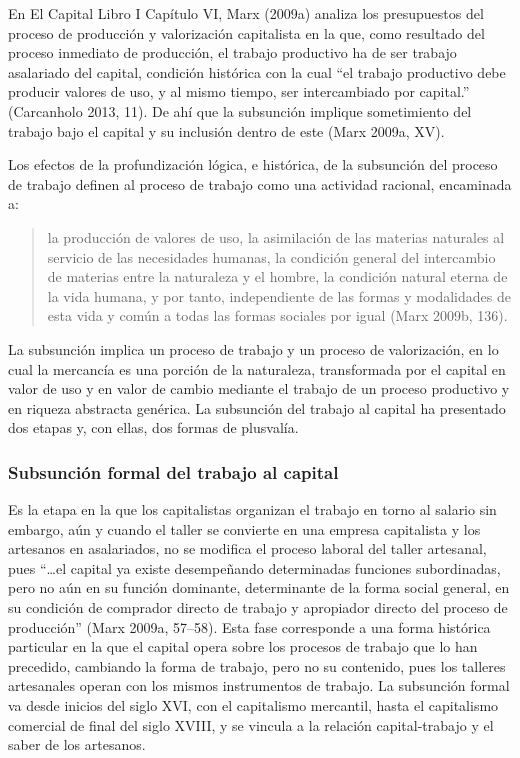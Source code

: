\documentclass[
]{interact}
\begin{document}
En El Capital Libro I Capítulo VI, Marx (2009a) analiza los presupuestos
del proceso de producción y valorización capitalista en la que, como
resultado del proceso inmediato de producción, el trabajo productivo ha
de ser trabajo asalariado del capital, condición histórica con la cual
``el trabajo productivo debe producir valores de uso, y al mismo tiempo,
ser intercambiado por capital.'' (Carcanholo 2013, 11). De ahí que la
subsunción implique sometimiento del trabajo bajo el capital y su
inclusión dentro de este (Marx 2009a, XV).

Los efectos de la profundización lógica, e histórica, de la subsunción
del proceso de trabajo definen al proceso de trabajo como una actividad
racional, encaminada a:

\begin{quote}
la producción de valores de uso, la asimilación de las materias
naturales al servicio de las necesidades humanas, la condición general
del intercambio de materias entre la naturaleza y el hombre, la
condición natural eterna de la vida humana, y por tanto, independiente
de las formas y modalidades de esta vida y común a todas las formas
sociales por igual (Marx 2009b, 136).
\end{quote}

La subsunción implica un proceso de trabajo y un proceso de
valorización, en lo cual la mercancía es una porción de la naturaleza,
transformada por el capital en valor de uso y en valor de cambio
mediante el trabajo de un proceso productivo y en riqueza abstracta
genérica. La subsunción del trabajo al capital ha presentado dos etapas
y, con ellas, dos formas de plusvalía.

\subsubsection{Subsunción formal del trabajo al
capital}\label{subsunciuxf3n-formal-del-trabajo-al-capital}

Es la etapa en la que los capitalistas organizan el trabajo en torno al
salario sin embargo, aún y cuando el taller se convierte en una empresa
capitalista y los artesanos en asalariados, no se modifica el proceso
laboral del taller artesanal, pues ``\ldots el capital ya existe
desempeñando determinadas funciones subordinadas, pero no aún en su
función dominante, determinante de la forma social general, en su
condición de comprador directo de trabajo y apropiador directo del
proceso de producción'' (Marx 2009a, 57--58). Esta fase corresponde a
una forma histórica particular en la que el capital opera sobre los
procesos de trabajo que lo han precedido, cambiando la forma de trabajo,
pero no su contenido, pues los talleres artesanales operan con los
mismos instrumentos de trabajo. La subsunción formal va desde inicios
del siglo XVI, con el capitalismo mercantil, hasta el capitalismo
comercial de final del siglo XVIII, y se vincula a la relación
capital-trabajo y el saber de los artesanos.
\end{document}

